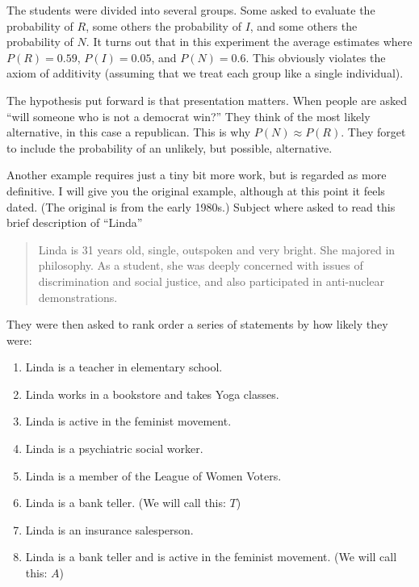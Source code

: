 The students were divided into several groups.  Some asked to evaluate the probability of $R$, some others the probability of $I$, and some others the probability of $N$.  It turns out that in this experiment the average estimates where $P(R) = 0.59$, $P(I) = 0.05$, and $P(N) = 0.6$.  This obviously violates the axiom of additivity (assuming that we treat each group like a single individual).

The hypothesis put forward is that presentation matters. When people are asked ``will someone who is not a democrat win?'' They think of the most likely alternative, in this case a republican.  This is why $P(N) \approx P(R)$.  They forget to include the probability of an unlikely, but possible, alternative.


Another example requires just a tiny bit more work, but is regarded as more definitive.  I will give you the original example, although at this point it feels dated.  (The original is from the early 1980s.)  Subject where asked to read this brief description of ``Linda'' 


\begin{quote}
Linda is 31 years old, single, outspoken and very bright. She majored in philosophy. As a student, she was deeply concerned with issues of discrimination and social justice, and also participated in anti-nuclear demonstrations.
\end{quote}

They were then asked to rank order a series of statements by how likely they were:

\begin{enumerate}
\item Linda is a teacher in elementary school. 
\item Linda works in a bookstore and takes Yoga classes. 
\item Linda is active in the feminist movement. 
\item Linda is a psychiatric social worker. 
\item Linda is a member of the League of Women Voters. 
\item Linda is a bank teller. (We will call this: $T$) 
\item Linda is an insurance salesperson. 
\item Linda is a bank teller and is active in the feminist movement. (We will call this: $A$)
\end{enumerate}

